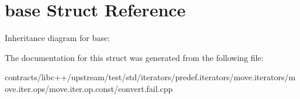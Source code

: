 \hypertarget{structbase}{}\section{base Struct Reference}
\label{structbase}


Inheritance diagram for base\+:


The documentation for this struct was generated from the following file\+:\begin{DoxyCompactItemize}
\item 
contracts/libc++/upstream/test/std/iterators/predef.\+iterators/move.\+iterators/move.\+iter.\+ops/move.\+iter.\+op.\+const/convert.\+fail.\+cpp\end{DoxyCompactItemize}
